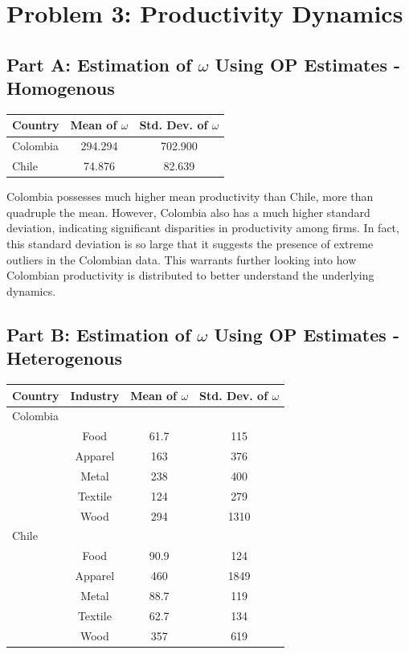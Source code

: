 \documentclass{article}
\begin{document}
\section*{Problem 3: Productivity Dynamics}

\subsection*{Part A: Estimation of $\omega$ Using OP Estimates - Homogenous}

\begin{center}
\begin{tabular}[h]{|lcc|}
  \hline
  \textbf{Country} & \textbf{Mean of $\omega$} & \textbf{Std. Dev. of $\omega$} \\
  \hline
  Colombia & 294.294 & 702.900 \\
  Chile & 74.876 & 82.639 \\
  \hline
\end{tabular}
\end{center}

Colombia possesses much higher mean productivity than Chile, more than quadruple the mean.
However, Colombia also has a much higher standard deviation, indicating significant disparities in productivity among firms.
In fact, this standard deviation is so large that it suggests the presence of extreme outliers in the Colombian data.
This warrants further looking into how Colombian productivity is distributed to better understand the underlying dynamics.

\subsection*{Part B: Estimation of $\omega$ Using OP Estimates - Heterogenous}

\begin{center}
\begin{tabular}[h]{|lccc|}
  \hline
  \textbf{Country} & \textbf{Industry} & \textbf{Mean of $\omega$} & \textbf{Std. Dev. of $\omega$} \\
  \hline
  Colombia & & & \\
  \hline
   & Food & 61.7 & 115 \\
   & Apparel & 163 & 376 \\
   & Metal & 238 & 400 \\
   & Textile & 124 & 279 \\
   & Wood & 294 & 1310 \\
  Chile & & & \\
  \hline
   & Food & 90.9 & 124 \\
   & Apparel & 460 & 1849 \\
   & Metal & 88.7 & 119 \\
   & Textile & 62.7 & 134 \\
   & Wood & 357 & 619 \\
    \hline
\end{tabular}
\end{center}
\end{document}
